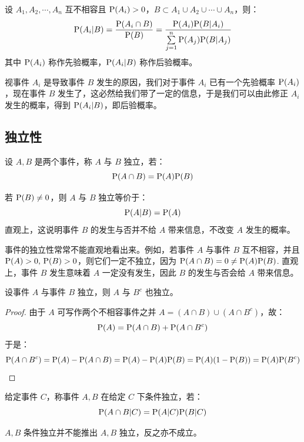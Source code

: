 \begin{theorem}[贝叶斯公式]
设 $A_1,A_2,\cdots,A_n$ 互不相容且 $\mathrm{P}(A_i)>0$，$B\subset A_1\cup A_2\cup\cdots\cup A_n$，则：
\[\mathrm{P}(A_i\vert B)=\frac{\mathrm{P}(A_i\cap B)}{\mathrm{P}(B)}=\frac{\mathrm{P}(A_i)\mathrm{P}(B\vert A_i)}{\sum\limits_{j=1}^n\mathrm{P}(A_j)\mathrm{P}(B\vert A_j)}\]
其中 $\mathrm{P}(A_i)$ 称作先验概率，$\mathrm{P}(A_i\vert B)$ 称作后验概率。
\end{theorem}

\begin{remark}[关于贝叶斯公式的理解]
视事件 $A_i$ 是导致事件 $B$ 发生的原因，我们对于事件 $A_i$ 已有一个先验概率 $\mathrm{P}(A_i)$，现在事件 $B$ 发生了，这必然给我们带了一定的信息，于是我们可以由此修正 $A_i$ 发生的概率，得到 $\mathrm{P}(A_i\vert B)$，即后验概率。
\end{remark}


\subsection{独立性}

\begin{definition}[独立]
设 $A,B$ 是两个事件，称 $A$ 与 $B$ 独立，若：\[\mathrm{P}(A\cap B)=\mathrm{P}(A)\mathrm{P}(B)\]
\end{definition}
\begin{com}
若 $\mathrm{P}(B)\neq 0$，则 $A$ 与 $B$ 独立等价于：
\[\mathrm{P}(A\vert B)=\mathrm{P}(A)\]
直观上，这说明事件 $B$ 的发生与否并不给 $A$ 带来信息，不改变 $A$ 发生的概率。
\end{com}
\begin{note}
事件的独立性常常不能直观地看出来。例如，若事件 $A$ 与事件 $B$ 互不相容，并且 $\mathrm{P}(A)>0,\,\mathrm{P}(B)>0$，则它们一定不独立，因为 $\mathrm{P}(A\cap B)=0\neq\mathrm{P}(A)\mathrm{P}(B)$. 直观上，事件 $B$ 发生意味着 $A$ 一定没有发生，因此 $B$ 的发生与否会给 $A$ 带来信息。
\end{note}

\begin{theorem}
设事件 $A$ 与事件 $B$ 独立，则 $A$ 与 $B^c$ 也独立。
\end{theorem}
\begin{proof}
由于 $A$ 可写作两个不相容事件之并 $A=(A\cap B)\cup (A\cap B^c)$，故：
\[
\mathrm{P}(A)=\mathrm{P}(A\cap B)+\mathrm{P}(A\cap B^c)
\]
于是：
\[
\mathrm{P}(A\cap B^c)=\mathrm{P}(A)-\mathrm{P}(A\cap B)=\mathrm{P}(A)-\mathrm{P}(A)\mathrm{P}(B)=\mathrm{P}(A)(1-\mathrm{P}(B))=\mathrm{P}(A)\mathrm{P}(B^c)
\]
\end{proof}

\begin{definition}[条件独立]
给定事件 $C$，称事件 $A,B$ 在给定 $C$ 下条件独立，若：
\[\mathrm{P}(A\cap B\vert C)=\mathrm{P}(A\vert C)\mathrm{P}(B\vert C)\]
\end{definition}
\begin{com}
$A,B$ 条件独立并不能推出 $A,B$ 独立，反之亦不成立。
\end{com}

